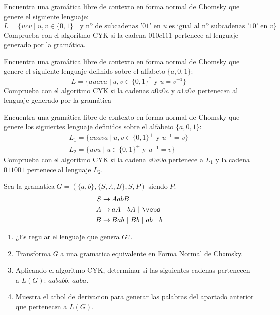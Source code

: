 \begin{ejercicio}\label{ej:1.6.11}
    Encuentra una gramática libre de contexto en forma normal de Chomsky que genere el siguiente lenguaje:
    \begin{equation*}
        L = \{ucv \mid u,v\in {\{0,1\}}^{+} \text{\ y nº de subcadenas '} 01 \text{' en\ } u \text{\ es igual al nº subcadenas '}10 \text{' en\ }v\}
    \end{equation*}
    Comprueba con el algoritmo CYK si la cadena $010c101$ pertenece al lenguaje generado por la gramática.
\end{ejercicio}

\begin{ejercicio}\label{ej:1.6.12}
    Encuentra una gramática libre de contexto en forma normal de Chomsky que genere el siguiente lenguaje definido sobre el alfabeto $\{a,0,1\}$:
    \begin{equation*}
        L = \{auava \mid u,v\in {\{0,1\}}^{\ast} \text{\ y\ } u=v^{-1}\}
    \end{equation*}
    Comprueba con el algoritmo CYK si la cadenas $a0a0a$ y $a1a0a$ pertenecen al lenguaje generado por la gramática.
\end{ejercicio}

\begin{ejercicio}\label{ej:1.6.13}
    Encuentra una gramática libre de contexto en forma normal de Chomsky que genere los siguientes lenguaje definidos sobre el alfabeto $\{a,0,1\}$:
    \begin{gather*}
        L_1 = \{auava \mid u,v \in {\{0,1\}}^{+} \text{\ y\ } u^{-1} = v\} \\
        L_2 = \{uvu \mid u\in {\{0,1\}}^{+}\text{\ y\ } u^{-1} = v\}
    \end{gather*}
    Comprueba con el algoritmo CYK si la cadena $a0a0a$ pertenece a $L_1$ y la cadena $011001$ pertenece al lenguaje $L_2$.
\end{ejercicio}

\begin{ejercicio}\label{ej:1.6.14}
    Sea la gramatica $G = (\{a,b\},\{S,A,B\},S,P)$ siendo $P$:
    \begin{align*}
        S&\rightarrow AabB \\
        A &\rightarrow aA\ |\ bA\ |\ \veps \\
        B&\rightarrow Bab\ |\ Bb\ |\ ab\ |\ b
    \end{align*}
    \begin{enumerate}
        \item ¿Es regular el lenguaje que genera $G$?.
        \item Transforma $G$ a una gramatica equivalente en Forma Normal de Chomsky.
        \item Aplicando el algoritmo CYK, determinar si las siguientes cadenas pertenecen a $L(G)$: $aababb$, $aaba$.
        \item Muestra el arbol de derivacion para generar las palabras del apartado anterior que pertenecen a $L(G)$.
    \end{enumerate}
\end{ejercicio}

